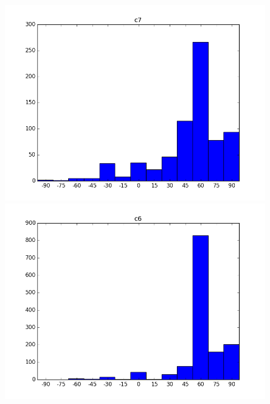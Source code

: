 \documentclass{beamer}
\begin{document}
\begin{frame}
\begin{columns}
\begin{column}{0.5\textwidth}
\begin{center}
		 			\includegraphics[width=0.85\textwidth]{headpose_evaluation_c7}\\
		 			\includegraphics[width=0.85\textwidth]{headpose_evaluation_c6}
		 		\end{center}
		 	\end{column}
		 \end{columns}
		
	\end{frame}
	
\end{document}
